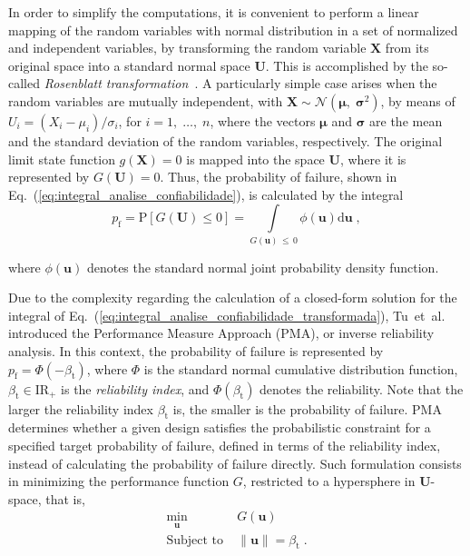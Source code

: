 \documentclass[final,5p,times,twocolumn,numbers]{elsarticle}
\newcommand{\vect}[1]{\mathbf{\boldsymbol{#1}}}
\newcommand{\norm}[1]{\left\lVert#1\right\rVert}
\begin{document}
In order to simplify the computations, it is convenient to perform a linear mapping of the random variables with normal distribution in a set of normalized and independent variables, by transforming the random variable $ \mathbf {X} $ from its original space into a standard normal space $ \mathbf {U} $. This is accomplished by the so-called \textit{Rosenblatt transformation}~\cite{bib:rosenblatt1952}. A particularly simple case arises when the random variables are mutually independent, with $ \mathbf{X} \sim \mathcal{N} \left( \vect{\mu}, \; \vect{\sigma}^{2} \right) $, by means of $ U_{i} = \left( X_{i} - \mu_{i} \right) / \sigma_{i} $, for $ i = 1, \; \dots, \; n $, where the vectors $ \vect{\mu} $ and $ \vect{\sigma} $ are the mean and the standard deviation of the random variables, respectively. The original limit state function $ g \left( \mathbf{X} \right) = 0 $ is mapped into the space $ \mathbf{U} $, where it is represented by $ G \left( \mathbf{U} \right) = 0 $. Thus, the probability of failure, shown in Eq.~(\ref{eq:integral_analise_confiabilidade}), is calculated by the integral
%
\begin{equation} \label{eq:integral_analise_confiabilidade_transformada}
p_{\mathrm{f}} = \mathrm{P} \left[ G \left( \mathbf{U} \right) \leq 0 \right] = \int\limits_{G \left( \mathbf{u} \right) \, \leq \, 0} \phi \left( \mathbf{u} \right) \mathrm{d} \mathbf{u} \; ,
\end{equation}

\noindent where $ \phi \left( \mathbf{u} \right) $ denotes the standard normal joint probability density function.

Due to the complexity regarding the calculation of a closed-form solution for the integral of Eq.~(\ref{eq:integral_analise_confiabilidade_transformada}), Tu~et~al.~\cite{bib:tu1999} introduced the Performance Measure Approach (PMA), or inverse reliability analysis. In this context, the probability of failure is represented by $ p_{\mathrm{f}} = \Phi \left( -\beta_{\mathrm{t}} \right) $, where $ \Phi $ is the standard normal cumulative distribution function, $ \beta_{\mathrm{t}} \in \mathrm{I\!R}_{+} $ is the \textit{reliability index}, and $ \Phi \left( \beta_{\mathrm{t}} \right) $ denotes the reliability. Note that the larger the reliability index $ \beta_{\mathrm{t}} $ is, the smaller is the probability of failure. PMA determines whether a given design satisfies the probabilistic constraint for a specified target probability of failure, defined in terms of the reliability index, instead of calculating the probability of failure directly. Such formulation consists in minimizing the performance function $ G $, restricted to a hypersphere in $ \mathbf {U} $-space, that is,
%
\begin{equation} \label{eq:formulacao_PMA}
\begin{split}
\min\limits_{\mathbf{u}} \; &G \left( \mathbf{u} \right)\\
\textrm{Subject to} \; &\norm{\mathbf{u}} = \beta_{\mathrm{t}} \; .
\end{split}
\end{equation}
\end{document}
